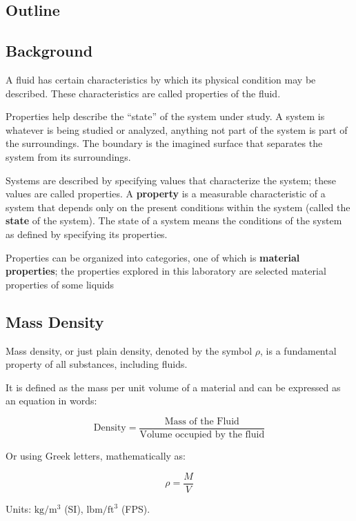 \documentclass[11pt]{article}
\begin{document}
    \hypertarget{outline}{%
\subsection{Outline}\label{outline}}

    

    \hypertarget{background}{%
\subsection{Background}\label{background}}

A fluid has certain characteristics by which its physical condition may
be described. These characteristics are called properties of the fluid.

Properties help describe the ``state'' of the system under study. A
system is whatever is being studied or analyzed, anything not part of
the system is part of the surroundings. The boundary is the imagined
surface that separates the system from its surroundings.

Systems are described by specifying values that characterize the system;
these values are called properties. A \textbf{property} is a measurable
characteristic of a system that depends only on the present conditions
within the system (called the \textbf{state} of the system). The state
of a system means the conditions of the system as defined by specifying
its properties.

Properties can be organized into categories, one of which is
\textbf{material properties}; the properties explored in this laboratory
are selected material properties of some liquids

    \hypertarget{mass-density}{%
\subsection{Mass Density}\label{mass-density}}

Mass density, or just plain density, denoted by the symbol \(\rho\), is
a fundamental property of all substances, including fluids.

It is defined as the mass per unit volume of a material and can be
expressed as an equation in words:

\[\text{Density} = \frac{\text{Mass of the Fluid}}{\text{Volume occupied by the fluid}}\]

Or using Greek letters, mathematically as:

\[\rho = \frac{M}{V}\]

Units: \(\mathrm{kg/m^3}\) (SI), \(\mathrm{lbm/ft^3}\) (FPS).
\end{document}
